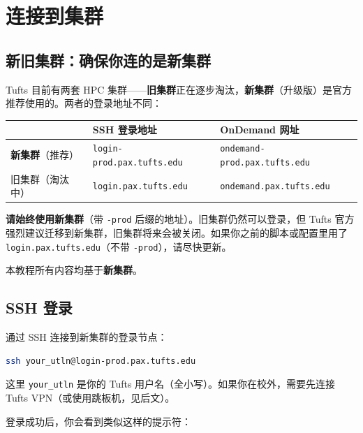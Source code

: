 \section{连接到集群}

\subsection{新旧集群：确保你连的是新集群}

Tufts 目前有两套 HPC 集群——\textbf{旧集群}正在逐步淘汰，\textbf{新集群}（升级版）是官方推荐使用的。两者的登录地址不同：

\begin{table}[h]
\centering
\begin{tabular}{lll}
\toprule
 & SSH 登录地址 & OnDemand 网址 \\
\midrule
\textbf{新集群}（推荐） & \texttt{login-prod.pax.tufts.edu} & \texttt{ondemand-prod.pax.tufts.edu} \\
旧集群（淘汰中） & \texttt{login.pax.tufts.edu} & \texttt{ondemand.pax.tufts.edu} \\
\bottomrule
\end{tabular}
\end{table}

\begin{warnbox}
\textbf{请始终使用新集群}（带 \texttt{-prod} 后缀的地址）。旧集群仍然可以登录，但 Tufts 官方强烈建议迁移到新集群，旧集群将来会被关闭。如果你之前的脚本或配置里用了 \texttt{login.pax.tufts.edu}（不带 \texttt{-prod}），请尽快更新。
\end{warnbox}

本教程所有内容均基于\textbf{新集群}。

\subsection{SSH 登录}

通过 SSH 连接到新集群的登录节点：

\begin{lstlisting}[language=bash]
ssh your_utln@login-prod.pax.tufts.edu
\end{lstlisting}

这里 \texttt{your\_utln} 是你的 Tufts 用户名（全小写）。如果你在校外，需要先连接 Tufts VPN（或使用跳板机，见后文）。

登录成功后，你会看到类似这样的提示符：

